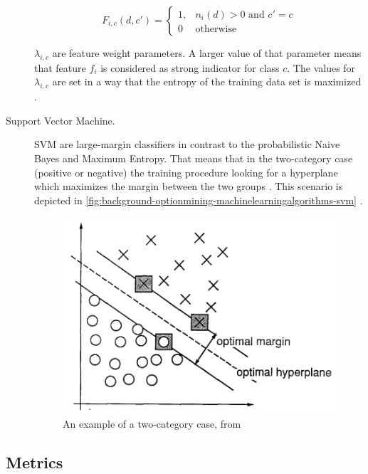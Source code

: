 \begin{description}
  \begin{equation}
  F_{i,c}(d,c') = 
    \begin{cases}
      1, & n_i(d) > 0 \text{ and } c' = c \\
      0  & \text{otherwise}
    \end{cases}
	\label{eq:background-optionmining-machinelearningalgorithms-maximumentropy_fic}
  \end{equation}

  $\lambda_{i,c}$ are feature weight parameters. A larger value of that parameter means that feature $f_i$ is considered as strong indicator for class $c$.
  The values for $\lambda_{i,c}$ are set in a way that the entropy of the training data set is maximized \cite{Pang2002}.
  	
	\item[Support Vector Machine.]
   \ac{SVM} are large-margin classifiers in contrast to the probabilistic Naive Bayes and Maximum Entropy.
   That means that in the two-category case (positive or negative) the training procedure looking for a hyperplane which maximizes the margin between the two groups \cite{Pang2002}.
   This scenario is depicted in \autoref{fig:background-optionmining-machinelearningalgorithms-svm} \cite[p. 275]{Cortes1995}.
      
   \begin{figure}[ht]
    \centering
    \includegraphics[width=.7\textwidth]{images/svm.png}
    \caption{An example of a two-category case, from \cite[p. 275]{Cortes1995}}
    \label{fig:background-optionmining-machinelearningalgorithms-svm}
  \end{figure}
	
\end{description}

\subsection{Metrics}
\label{ss:background-optionmining-metrics}

